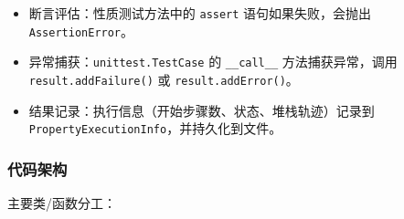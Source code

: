 \documentclass[a4paper, zihao=-4]{ctexart}
\newcommand{\bff}[1]{{\heiti #1}}
\begin{document}
\begin{itemize}
    \item \bff{断言评估}：性质测试方法中的 \texttt{assert} 语句如果失败，会抛出 \texttt{AssertionError}。
    \item \bff{异常捕获}：\texttt{unittest.TestCase} 的 \texttt{\_\_call\_\_} 方法捕获异常，调用 \texttt{result.addFailure()} 或 \texttt{result.addError()}。
    \item \bff{结果记录}：执行信息（开始步骤数、状态、堆栈轨迹）记录到 \texttt{PropertyExecutionInfo}，并持久化到文件。
\end{itemize}

\subsubsection{代码架构}

\bff{主要类/函数分工}：
\end{document}
